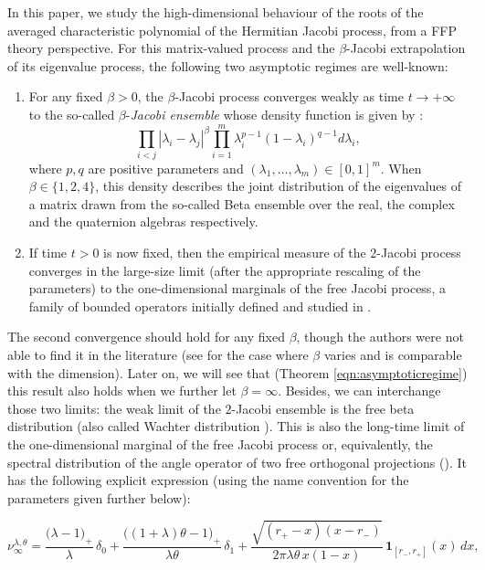 \documentclass[12pt,reqno]{amsart}
\begin{document}
In this paper, we study the high-dimensional behaviour of the roots of the averaged characteristic polynomial of the Hermitian Jacobi process, from a FFP theory perspective. 
For this matrix-valued process and the $\beta$-Jacobi extrapolation of its eigenvalue process, the following two asymptotic regimes are well-known:
\begin{enumerate}
\item For any fixed $\beta > 0$, the $\beta$-Jacobi process converges weakly as time $t \rightarrow +\infty$ to the so-called
$\beta$-\emph{Jacobi ensemble} whose density function is given by \cite{MR2719370}: %
$$
\prod_{i < j } |\lambda_i-\lambda_j|^{\beta} \prod_{i=1}^m \lambda_i^{p-1}(1-\lambda_i)^{q-1} d\lambda_i,
$$
where $p,q$ are positive parameters and $(\lambda_1,\dots, \lambda_m) \in [0,1]^m$. When $\beta \in \{1,2,4\}$, this density describes the joint distribution of the eigenvalues of a matrix drawn from the so-called Beta ensemble over the real, the complex and the quaternion algebras respectively. 
\item If time $t > 0$ is now fixed, then the empirical measure of the $2$-Jacobi process converges in the large-size limit (after the appropriate rescaling of the parameters) to the one-dimensional marginals of the free Jacobi process, a family of bounded operators initially defined and studied in \cite{MR2384475}. 
\end{enumerate}
The second convergence should hold for any fixed $\beta$, though the authors were not able to find it in the literature (see \cite{TT} for the case where $\beta$ varies and is comparable with the dimension). Later on, we will see that (Theorem \ref{eqn:asymptoticregime}) this result also holds when we further let $\beta = \infty$. 
Besides, we can interchange those two limits: the weak limit of the $2$-Jacobi ensemble is the free beta distribution (also called Wachter distribution \cite{Wac}). This is also the long-time limit of the one-dimensional marginal of the free Jacobi process or, equivalently, the spectral distribution of the angle operator of two free orthogonal projections (\cite{VDN}). It has the following explicit expression (using the name convention for the parameters given further below): 

\begin{equation*}
\nu_{\infty}^{\lambda,\theta}
= \frac{\bigl(\lambda-1\bigr)_{+}}{\lambda}\,\delta_{0}
+ \frac{\bigl((1+\lambda)\theta-1\bigr)_{+}}{\lambda\theta}\,\delta_{1}
+ \frac{\sqrt{(r_{+}-x)(x-r_{-})}}{2\pi\lambda\theta\,x(1-x)}\,
  \mathbf{1}_{[r_{-},r_{+}]}(x)\,dx,
\end{equation*}
\end{document}
